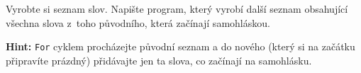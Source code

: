 \question[50]
Vyrobte si seznam slov. Napište program, který vyrobí další seznam obsahující
všechna slova z~toho původního, která začínají samohláskou.

\textbf{Hint:} \texttt{For} cyklem procházejte původní seznam a do nového (který
si na začátku připravíte prázdný) přidávajte jen ta slova, co začínají na samohlásku.
